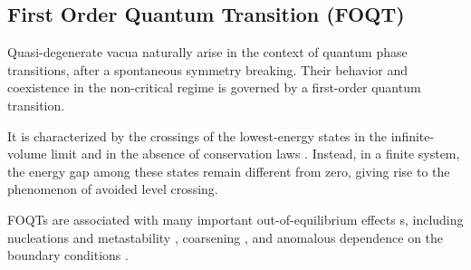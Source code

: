 \subsection{First Order Quantum Transition (FOQT)}
\label{FOQTeq}

Quasi-degenerate vacua naturally arise in the context of quantum phase transitions, after a spontaneous symmetry breaking. Their behavior and coexistence in the non-critical regime is governed by a first-order quantum transition.

It is characterized by the crossings of the lowest-energy states in the infinite-volume limit and in the absence of conservation laws \cite{plissetto2023scaling}.
Instead, in a finite system, the energy gap among these states remain different from zero, giving rise to the phenomenon of avoided level crossing.

FOQTs are associated with many important out-of-equilibrium effects s, including nucleations and metastability \cite{binder1987theory,bray2002theory}, coarsening \cite{chandran2012kibble}, and anomalous dependence on the boundary conditions \cite{pelissetto2020scaling,panagopoulos2018dynamic,campostrini2015quantum,pelissetto2018finite,rossini2018ground}.


